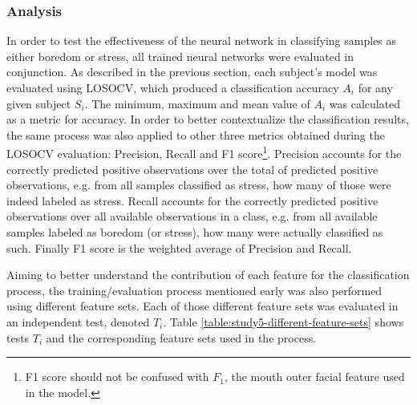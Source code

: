 \subsubsection{Analysis}
\label{s:experiment1-study5-analysis}

In order to test the effectiveness of the neural network in classifying samples as either boredom or stress, all trained neural networks were evaluated in conjunction. As described in the previous section, each subject's model was evaluated using LOSOCV, which produced a classification accuracy $A_i$ for any given subject $S_i$. The minimum, maximum and mean value of $A_i$ was calculated as a metric for accuracy. In order to better contextualize the classification results, the same process was also applied to other three metrics obtained during the LOSOCV evaluation: Precision, Recall and F1 score\footnote{F1 score should not be confused with $F_1$, the mouth outer facial feature used in the model.}. Precision accounts for the correctly predicted positive observations over the total of predicted positive observations, e.g. from all samples classified as stress, how many of those were indeed labeled as stress. Recall accounts for the correctly predicted positive observations over all available observations in a class, e.g. from all available samples labeled as boredom (or stress), how many were actually classified as such. Finally F1 score is the weighted average of Precision and Recall.

Aiming to better understand the contribution of each feature for the classification process, the training/evaluation process mentioned early was also performed using different feature sets. Each of those different feature sets was evaluated in an independent test, denoted $T_i$. Table \ref{table:study5-different-feature-sets} shows tests $T_i$ and the corresponding feature sets used in the process.

